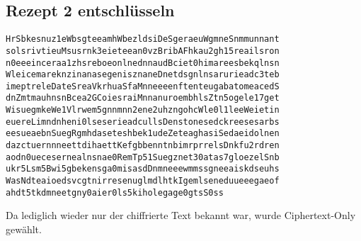 \subsection{Rezept 2 entschlüsseln}
\label{RezeptZweiEntschluesseln}

\begin{lstlisting}[caption={Das verschlüsselte 2. Rezept: Rezept2NR.txt},
 linewidth=\textwidth,
 breaklines, breakatwhitespace=false]
HrSbkesnuz1eWbsgteeamhWbezldsiDeSgeraeuWgmneSnmmunnant
solsrivtieuMsusrnk3eieteean0vzBribAFhkau2gh15reailsron
n0eeeinceraa1zhsreboeonlnednnaudBciet0himareesbekqlnsn
WleicemareknzinanasegenisznaneDnetdsgnlnsarurieadc3teb
imeptreleDateSreaVkrhuaSfaMnneeeenftenteugabatomeacedS
dnZmtmauhnsnBcea2GCoiesraiMnnanuroembhlsZtn5ogele17get
WisuegmkeWe1Vlrwem5gnnmnn2ene2uhzngohcWle0l1leeWeietin
euereLimndnheni0lseserieadcullsDenstonesedckreesesarbs
eesueaebnSuegRgmhdaseteshbek1udeZeteaghasiSedaeidolnen
dazctuernnneettdihaettKefgbbenntnbimrprrelsDnkfu2rdren
aodn0uecesernealnsnae0RemTp51Suegznet30atas7gloezelSnb
ukr5Lsm5Bwi5gbekensga0misasdDnmneeewmmssgneeaiskdseuhs
WasNdteaioedsvcgtnirresenuglmdlhtkIgemlseneduueeegaeof
ahdt5tkdmneetgny0aier0ls5kiholegage0gtsS0ss
\end{lstlisting}

Da lediglich wieder nur der chiffrierte Text bekannt war, wurde Ciphertext-Only
gewählt.

%

